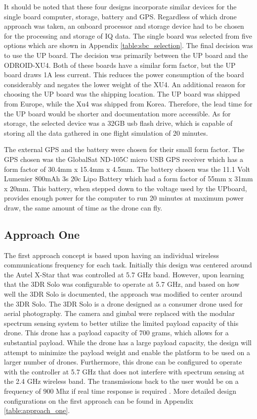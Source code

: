 It should be noted that these four designs incorporate similar devices for the single board computer, storage, battery and GPS. Regardless of which drone approach was taken, an onboard processor and storage device had to be chosen for the processing and storage of IQ data. The single board was selected from five options which are shown in Appendix \ref{table:sbc_selection}. The final decision was to use the UP board. The decision was primarily between the UP board and the ODROID-XU4. Both of these boards have a similar form factor, but the UP board draws 1A less current. This reduces the power consumption of the board considerably and negates the lower weight of the XU4. An additional reason for choosing the UP board was the shipping location. The UP board was shipped from Europe, while the Xu4 was shipped from Korea. Therefore, the lead time for the UP board would be shorter and documentation more accessible. As for storage, the selected device was a 32GB usb flash drive, which is capable of storing all the data gathered in one flight simulation of 20 minutes. \par

The external GPS and the battery were chosen for their small form factor. The GPS chosen was the GlobalSat ND-105C micro USB GPS receiver which has a form factor of 30.4mm x 15.4mm x 4.5mm. The battery chosen was the 11.1 Volt Lumenier 800mAh 3s 20c Lipo Battery which had a form factor of 55mm x 31mm x 20mm. This battery, when stepped down to the voltage used by the UPboard, provides enough power for the computer to run 20 minutes at maximum power draw, the same amount of time as the drone can fly. 

\subsection{Approach One}
The first approach concept is based upon having an individual wireless communications frequency for each task. Initially this design was centered around the Autel X-Star that was controlled at 5.7 GHz band. However, upon learning that the 3DR Solo was configurable to operate at 5.7 GHz, and based on how well the 3DR Solo is documented, the approach was modified to center around the 3DR Solo. The 3DR Solo is a drone designed as a consumer drone used for aerial photography. The camera and gimbal were replaced with the modular spectrum sensing system to better utilize the limited payload capacity of this drone. This drone has a payload capacity of 700 grams, which allows for a substantial payload. While the drone has a large payload capacity, the design will attempt to minimize the payload weight and enable the platform to be used on a larger number of drones. Furthermore, this drone can be configured to operate with the controller at 5.7 GHz that does not interfere with spectrum sensing at the 2.4 GHz wireless band. The transmissions back to the user would be on a frequency of 900 Mhz if real time response is required \cite{3dr_Website}. More detailed design configurations on the first approach can be found in Appendix \ref{table:approach_one}.

